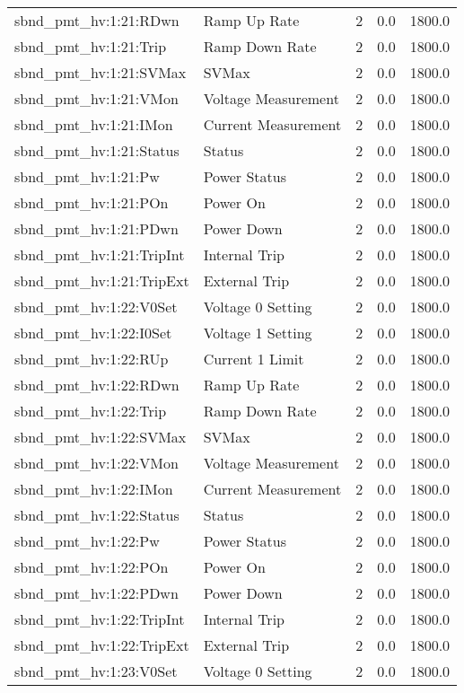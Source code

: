 \begin{center}
\begin{longtable}{l | l l l l }
sbnd\_pmt\_hv:1:21:RDwn & Ramp Up Rate & 2 & 0.0 & 1800.0\\ 
sbnd\_pmt\_hv:1:21:Trip & Ramp Down Rate & 2 & 0.0 & 1800.0\\ 
sbnd\_pmt\_hv:1:21:SVMax & SVMax & 2 & 0.0 & 1800.0\\ 
sbnd\_pmt\_hv:1:21:VMon & Voltage Measurement & 2 & 0.0 & 1800.0\\ 
sbnd\_pmt\_hv:1:21:IMon & Current Measurement & 2 & 0.0 & 1800.0\\ 
sbnd\_pmt\_hv:1:21:Status & Status & 2 & 0.0 & 1800.0\\ 
sbnd\_pmt\_hv:1:21:Pw & Power Status & 2 & 0.0 & 1800.0\\ 
sbnd\_pmt\_hv:1:21:POn & Power On & 2 & 0.0 & 1800.0\\ 
sbnd\_pmt\_hv:1:21:PDwn & Power Down & 2 & 0.0 & 1800.0\\ 
sbnd\_pmt\_hv:1:21:TripInt & Internal Trip & 2 & 0.0 & 1800.0\\ 
sbnd\_pmt\_hv:1:21:TripExt & External Trip & 2 & 0.0 & 1800.0\\ 
sbnd\_pmt\_hv:1:22:V0Set & Voltage 0 Setting & 2 & 0.0 & 1800.0\\ 
sbnd\_pmt\_hv:1:22:I0Set & Voltage 1 Setting & 2 & 0.0 & 1800.0\\ 
sbnd\_pmt\_hv:1:22:RUp & Current 1 Limit & 2 & 0.0 & 1800.0\\ 
sbnd\_pmt\_hv:1:22:RDwn & Ramp Up Rate & 2 & 0.0 & 1800.0\\ 
sbnd\_pmt\_hv:1:22:Trip & Ramp Down Rate & 2 & 0.0 & 1800.0\\ 
sbnd\_pmt\_hv:1:22:SVMax & SVMax & 2 & 0.0 & 1800.0\\ 
sbnd\_pmt\_hv:1:22:VMon & Voltage Measurement & 2 & 0.0 & 1800.0\\ 
sbnd\_pmt\_hv:1:22:IMon & Current Measurement & 2 & 0.0 & 1800.0\\ 
sbnd\_pmt\_hv:1:22:Status & Status & 2 & 0.0 & 1800.0\\ 
sbnd\_pmt\_hv:1:22:Pw & Power Status & 2 & 0.0 & 1800.0\\ 
sbnd\_pmt\_hv:1:22:POn & Power On & 2 & 0.0 & 1800.0\\ 
sbnd\_pmt\_hv:1:22:PDwn & Power Down & 2 & 0.0 & 1800.0\\ 
sbnd\_pmt\_hv:1:22:TripInt & Internal Trip & 2 & 0.0 & 1800.0\\ 
sbnd\_pmt\_hv:1:22:TripExt & External Trip & 2 & 0.0 & 1800.0\\ 
sbnd\_pmt\_hv:1:23:V0Set & Voltage 0 Setting & 2 & 0.0 & 1800.0\\ 

\end{longtable}
\end{center}
